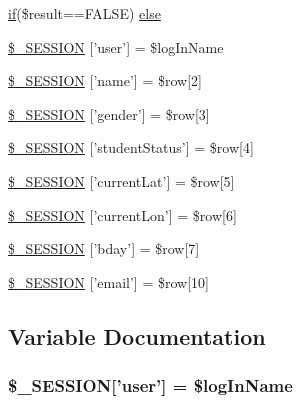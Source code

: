 \begin{DoxyCompactItemize}
\hyperlink{_m_c_mhome_page_8php_a8dec719c1645067d1065f7f064d4b967}{if}(\$result==F\-A\-L\-S\-E) \hyperlink{_m_c_mlogin_validator_8php_acd73321adf3d3d588369f5341463f6d3}{else}
\item 
\hyperlink{_m_c_mlogin_validator_8php_ad8419ca4a1822c7709da25d22be71556}{\$\-\_\-\-S\-E\-S\-S\-I\-O\-N} \mbox{[}'user'\mbox{]} = \$log\-In\-Name
\item 
\hyperlink{_m_c_mlogin_validator_8php_a28160a1a842d943c7e01744e36ed3f12}{\$\-\_\-\-S\-E\-S\-S\-I\-O\-N} \mbox{[}'name'\mbox{]} = \$row\mbox{[}2\mbox{]}
\item 
\hyperlink{_m_c_mlogin_validator_8php_aa3a2eeaf66026c99c70e449ad6b63443}{\$\-\_\-\-S\-E\-S\-S\-I\-O\-N} \mbox{[}'gender'\mbox{]} = \$row\mbox{[}3\mbox{]}
\item 
\hyperlink{_m_c_mlogin_validator_8php_a2e5fe3d8a57942cdc50ba0e3c15709d1}{\$\-\_\-\-S\-E\-S\-S\-I\-O\-N} \mbox{[}'student\-Status'\mbox{]} = \$row\mbox{[}4\mbox{]}
\item 
\hyperlink{_m_c_mlogin_validator_8php_ae9bea2c172c6e45b5fa244fbe5b5c586}{\$\-\_\-\-S\-E\-S\-S\-I\-O\-N} \mbox{[}'current\-Lat'\mbox{]} = \$row\mbox{[}5\mbox{]}
\item 
\hyperlink{_m_c_mlogin_validator_8php_a495c1ee274ceff11c34844d906b5f68d}{\$\-\_\-\-S\-E\-S\-S\-I\-O\-N} \mbox{[}'current\-Lon'\mbox{]} = \$row\mbox{[}6\mbox{]}
\item 
\hyperlink{_m_c_mlogin_validator_8php_adc919a8f6aa1790705e1fd5dedbcb2ec}{\$\-\_\-\-S\-E\-S\-S\-I\-O\-N} \mbox{[}'bday'\mbox{]} = \$row\mbox{[}7\mbox{]}
\item 
\hyperlink{_m_c_mlogin_validator_8php_ac14cd5920e81ae9195ee7dedc259298e}{\$\-\_\-\-S\-E\-S\-S\-I\-O\-N} \mbox{[}'email'\mbox{]} = \$row\mbox{[}10\mbox{]}
\end{DoxyCompactItemize}


\subsection{Variable Documentation}
\hypertarget{_m_c_mlogin_validator_8php_ad8419ca4a1822c7709da25d22be71556}{
\subsubsection[{\$\-\_\-\-S\-E\-S\-S\-I\-O\-N}]{\setlength{\rightskip}{0pt plus 5cm}\$\-\_\-\-S\-E\-S\-S\-I\-O\-N\mbox{[}'user'\mbox{]} = \$log\-In\-Name}}\label{_m_c_mlogin_validator_8php_ad8419ca4a1822c7709da25d22be71556}


